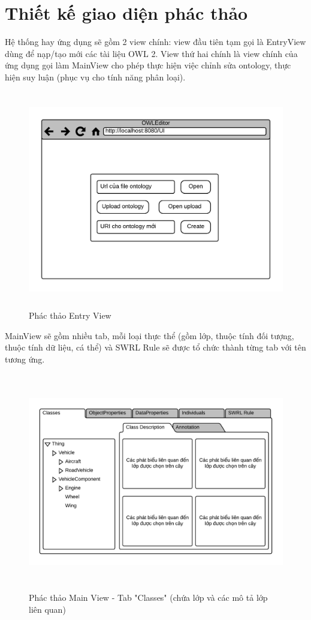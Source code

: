 \section{Thiết kế giao diện phác thảo}
Hệ thống hay ứng dụng sẽ gồm 2 view chính: view đầu tiên tạm gọi là EntryView dùng để nạp/tạo mới các tài liệu OWL 2. View thứ hai chính là view chính của ứng dụng gọi làm MainView cho phép thực hiện việc chỉnh sửa ontology, thực hiện suy luận (phục vụ cho tính năng phân loại). 
\begin{figure}[ht!]
	\centering
	\includegraphics[width=150mm,height=95mm]{Figures/ui_entryview.png}
	\caption{Phác thảo Entry View \label{overflow}}
\end{figure}
MainView sẽ gồm nhiều tab, mỗi loại thực thể (gồm lớp, thuộc tính đối tượng, thuộc tính dữ liệu, cá thể) và SWRL Rule sẽ được tổ chức thành từng tab với tên tương ứng. 
\begin{figure}[h!]
	\centering
	\includegraphics[width=150mm,height=95mm]{Figures/ui_mainview.png}
	\caption{Phác thảo Main View - Tab "Classes" (chứa lớp và các mô tả lớp liên quan) \label{overflow}}
\end{figure}
